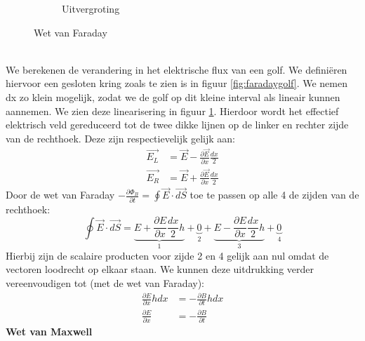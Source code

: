 \documentclass[a4paper,kul]{kulakarticle} %
\begin{document}
\begin{figure}[h]
\begin{subfigure}{.5\textwidth}
		\caption[Inzoom Faraday]{Uitvergroting}
		\label{fig:inzoomfaraday}
	\end{subfigure}
	\caption{Wet van Faraday}
	\label{fig:InductieFaraday}
\end{figure}\\

We berekenen de verandering in het elektrische flux van een golf. We definiëren hiervoor een gesloten kring zoals te zien is in figuur \ref{fig:faradaygolf}. We nemen dx zo klein mogelijk, zodat we de golf op dit kleine interval als lineair kunnen aannemen. We zien deze linearisering in figuur \ref{fig:inzoomfaraday}. Hierdoor wordt het effectief elektrisch veld gereduceerd tot de twee dikke lijnen op de linker en rechter zijde van de rechthoek. Deze zijn respectievelijk gelijk aan:
\begin{align*}
	\vec{E_L} &= \vec{E}-\frac{\partial\vec{E}}{\partial x}\frac{dx}{2}\\
	\vec{E_R} &= \vec{E}+\frac{\partial\vec{E}}{\partial x}\frac{dx}{2}	
\end{align*}
Door de wet van Faraday $-\frac{\partial\Phi_B}{\partial t}= \oint\vec{E}\cdot\vec{dS}$ toe te passen op alle 4 de zijden van de rechthoek:
\begin{equation*}
	\oint\vec{E}\cdot\vec{dS} = \underbrace{E+\frac{\partial E}{\partial x}\frac{dx}{2}h}_1 + \underbrace{0}_2 +\underbrace{E-\frac{\partial E}{\partial x}\frac{dx}{2}h}_3 + \underbrace{0}_4
\end{equation*}
Hierbij zijn de scalaire producten voor zijde 2 en 4 gelijk aan nul omdat de vectoren loodrecht op elkaar staan. We kunnen deze uitdrukking verder vereenvoudigen tot (met de wet van Faraday):
\begin{align}
	 \frac{\partial E}{\partial x}hdx &= -\frac{\partial B}{\partial t}hdx\\
	 \label{eq:inductieFaraday}
	 \frac{\partial E}{\partial x} &= -\frac{\partial B}{\partial t}
\end{align}
\newpage
\textbf{Wet van Maxwell}\\
\end{document}
